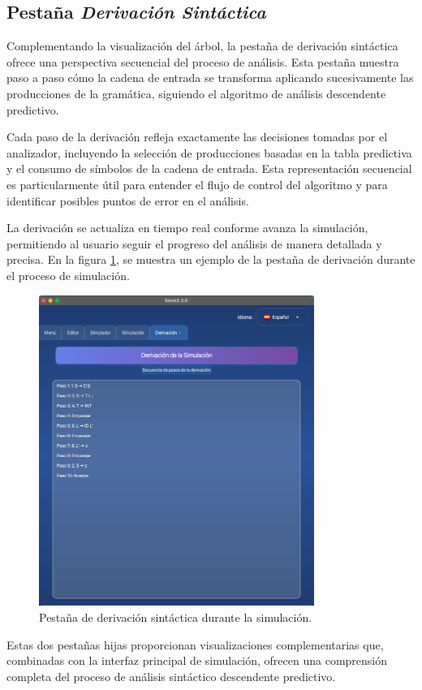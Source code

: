 \subsection{Pestaña \textit{Derivación Sintáctica}}

Complementando la visualización del árbol, la pestaña de derivación sintáctica ofrece una perspectiva secuencial del proceso de análisis. Esta pestaña muestra paso a paso cómo la cadena de entrada se transforma aplicando sucesivamente las producciones de la gramática, siguiendo el algoritmo de análisis descendente predictivo.

Cada paso de la derivación refleja exactamente las decisiones tomadas por el analizador, incluyendo la selección de producciones basadas en la tabla predictiva y el consumo de símbolos de la cadena de entrada. Esta representación secuencial es particularmente útil para entender el flujo de control del algoritmo y para identificar posibles puntos de error en el análisis.

La derivación se actualiza en tiempo real conforme avanza la simulación, permitiendo al usuario seguir el progreso del análisis de manera detallada y precisa. En la figura \ref{fig:derivacion}, se muestra un ejemplo de la pestaña de derivación durante el proceso de simulación.

\needspace{8cm}
\begin{figure}[H]
\centering
\includegraphics[width=0.8\textwidth]{figuras2/simulador/simulacion_derivacion.png}
\caption{Pestaña de derivación sintáctica durante la simulación.}
\label{fig:derivacion}
\end{figure}

Estas dos pestañas hijas proporcionan visualizaciones complementarias que, combinadas con la interfaz principal de simulación, ofrecen una comprensión completa del proceso de análisis sintáctico descendente predictivo.